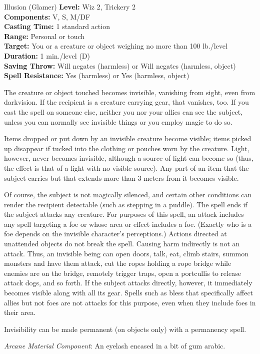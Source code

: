 {Illusion (Glamer)}
{
	\textbf{Level:}
	Wiz 2, Trickery 2\\
	\textbf{Components:}
	V, S, M/DF\\
	\textbf{Casting Time:}
	1 standard action\\
	\textbf{Range:}
	Personal or touch\\
	\textbf{Target:}
	You or a creature or object weighing no more than 100 lb./level\\
	\textbf{Duration:}
	1 min./level (D)\\
	\textbf{Saving Throw:}
	Will negates (harmless) or Will negates (harmless, object)\\
	\textbf{Spell Resistance:}
	Yes (harmless) or Yes (harmless, object)\\
}
{
	The creature or object touched becomes invisible, vanishing from sight, even from darkvision. If the recipient is a creature carrying gear, that vanishes, too. If you cast the spell on someone else, neither you nor your allies can see the subject, unless you can normally see invisible things or you employ magic to do so.

	Items dropped or put down by an invisible creature become visible; items picked up disappear if tucked into the clothing or pouches worn by the creature. Light, however, never becomes invisible, although a source of light can become so (thus, the effect is that of a light with no visible source). Any part of an item that the subject carries but that extends more than 3 meters from it becomes visible.

	Of course, the subject is not magically silenced, and certain other conditions can render the recipient detectable (such as stepping in a puddle). The spell ends if the subject attacks any creature. For purposes of this spell, an attack includes any spell targeting a foe or whose area or effect includes a foe. (Exactly who is a foe depends on the invisible character's perceptions.) Actions directed at unattended objects do not break the spell. Causing harm indirectly is not an attack. Thus, an invisible being can open doors, talk, eat, climb stairs, summon monsters and have them attack, cut the ropes holding a rope bridge while enemies are on the bridge, remotely trigger traps, open a portcullis to release attack dogs, and so forth. If the subject attacks directly, however, it immediately becomes visible along with all its gear. Spells such as bless that specifically affect allies but not foes are not attacks for this purpose, even when they include foes in their area.

	Invisibility can be made permanent (on objects only) with a permanency spell.

	\textit{Arcane Material Component}:
	An eyelash encased in a bit of gum arabic.

}
